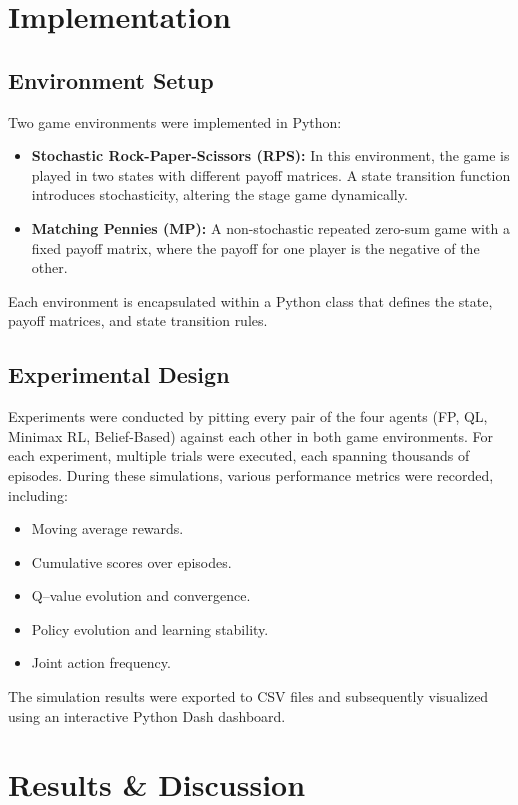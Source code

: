\documentclass[11pt]{article}
\begin{document}
\section{Implementation}

\subsection{Environment Setup}
Two game environments were implemented in Python:
\begin{itemize}
    \item \textbf{Stochastic Rock-Paper-Scissors (RPS):} In this environment, the game is played in two states with different payoff matrices. A state transition function introduces stochasticity, altering the stage game dynamically.
    \item \textbf{Matching Pennies (MP):} A non-stochastic repeated zero-sum game with a fixed payoff matrix, where the payoff for one player is the negative of the other.
\end{itemize}
Each environment is encapsulated within a Python class that defines the state, payoff matrices, and state transition rules.

\subsection{Experimental Design}
Experiments were conducted by pitting every pair of the four agents (FP, QL, Minimax RL, Belief-Based) against each other in both game environments. For each experiment, multiple trials were executed, each spanning thousands of episodes. During these simulations, various performance metrics were recorded, including:
\begin{itemize}
    \item Moving average rewards.
    \item Cumulative scores over episodes.
    \item Q–value evolution and convergence.
    \item Policy evolution and learning stability.
    \item Joint action frequency.
\end{itemize}
The simulation results were exported to CSV files and subsequently visualized using an interactive Python Dash dashboard.

\section{Results \& Discussion}
\label{sec:results-discussion}
\end{document}
